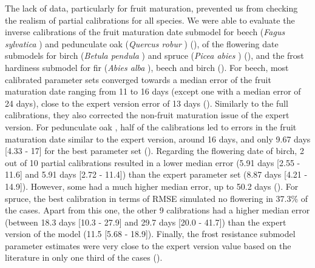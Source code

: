 \documentclass[letterpaper,8pt]{extarticle}  %
\begin{document}
\begin{doublespacing}
\begin{linenumbers}
The lack of data, particularly for fruit maturation, prevented us from checking the realism of partial calibrations for all species. We were able to evaluate the inverse calibrations of the fruit maturation date submodel for beech (\emph{\emph{Fagus sylvatica} }) and pedunculate oak (\emph{Quercus robur} ) (), of the flowering date submodels for birch (\emph{\emph{Betula pendula} }) and spruce  (\emph{\emph{Picea abies} }) (), and the frost hardiness submodel for fir (\emph{\emph{Abies alba} }), beech and birch (). For beech, most calibrated parameter sets converged towards a median error of the fruit maturation date ranging from 11 to 16 days (except one with a median error of 24 days), close to the expert version error of 13 days (). Similarly to the full calibrations, they also corrected the non-fruit maturation issue of the expert version. For pedunculate oak , half of the calibrations led to errors in the fruit maturation date similar to the expert version, around 16 days, and only 9.67 days [4.33 - 17] for the best parameter set (). Regarding the flowering date of birch, 2 out of 10 partial calibrations resulted in a lower median error (5.91 days [2.55 - 11.6] and 5.91 days [2.72 - 11.4]) than the expert parameter set (8.87 days [4.21 - 14.9]). However, some had a much higher median error, up to 50.2 days (). For spruce, the best calibration in terms of RMSE simulated no flowering in 37.3\% of the cases. Apart from this one, the other 9 calibrations had a higher median error (between 18.3 days [10.3 - 27.9] and 29.7 days [20.0 - 41.7]) than the expert version of the model (11.5 [5.68 - 18.9]). Finally, the frost resistance submodel parameter estimates were very close to the expert version value based on the literature in only one third of the cases ().




\end{linenumbers}
\end{doublespacing}
\end{document}
